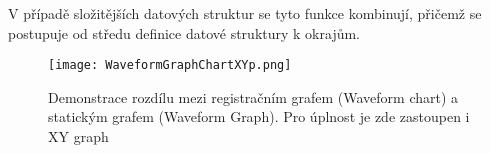      V případě složitějších datových struktur se tyto funkce kombinují, přičemž se postupuje od
     středu definice datové struktury k okrajům.  
       
     \begin{figure}[ht!]
       \centering
       \texttt{[image: WaveformGraphChartXYp.png]} 
       \caption[Waveform Graph, Waveform Chart a XY Graph]{Demonstrace rozdílu mezi registračním
       grafem (Waveform chart) a statickým grafem (Waveform Graph). Pro úplnost je zde zastoupen i
               XY graph}
       \label{EMS:fig_WaveformGraphChartXYp}
     \end{figure} 
        
\printbibliography[heading=subbibliography]